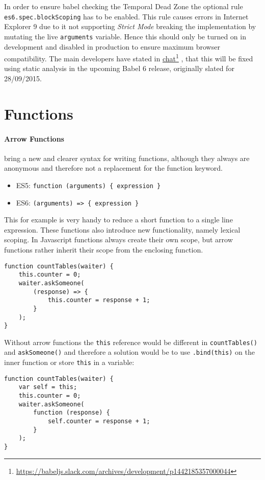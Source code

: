 \documentclass{bioinfo}
\newcommand\fnurl[2]{%
  \href{#1}{#2}\footnote{\url{#1}}%
}
\begin{document}
In order to ensure babel checking the Temporal Dead Zone the optional rule
{\tt es6.spec.blockScoping} has to be enabled. This rule causes errors in
Internet Explorer 9 due to it not supporting {\sl Strict Mode} breaking the
implementation by mutating the live {\tt arguments} variable. Hence this
should only be turned on in development and disabled in production
to ensure maximum browser compatibility. The main developers have stated in
\fnurl{https://babeljs.slack.com/archives/development/p1442185357000044}{chat},
that this will be fixed using static analysis in the upcoming Babel 6 release,
originally slated for 28/09/2015.

\section{Functions}
\paragraph{Arrow Functions}
bring a new and clearer syntax for writing functions, although
they always are anonymous and therefore not a replacement for the function keyword.
\begin{itemize}
    \item ES5: {\tt function (arguments) \{ expression \}}
    \item ES6: {\tt (arguments) => \{ expression \}}
\end{itemize}
This for example is very handy to reduce a short function to a single line expression.
These functions also introduce new functionality, namely lexical scoping.
In Javascript functions always create their own scope, but arrow functions
rather inherit their scope from the enclosing function.

\begin{lstlisting}
function countTables(waiter) {
    this.counter = 0;
    waiter.askSomeone(
        (response) => {
            this.counter = response + 1;
        }
    );
}
\end{lstlisting}

\vfill\break

Without arrow functions the {\tt this} reference would be different in
{\tt countTables()} and {\tt askSomeone()} and therefore a
solution would be to use {\tt .bind(this)} on the inner function or store
{\tt this} in a variable:

\begin{lstlisting}
function countTables(waiter) {
    var self = this;
    this.counter = 0;
    waiter.askSomeone(
        function (response) {
            self.counter = response + 1;
        }
    );
}
\end{lstlisting}
\end{document}
